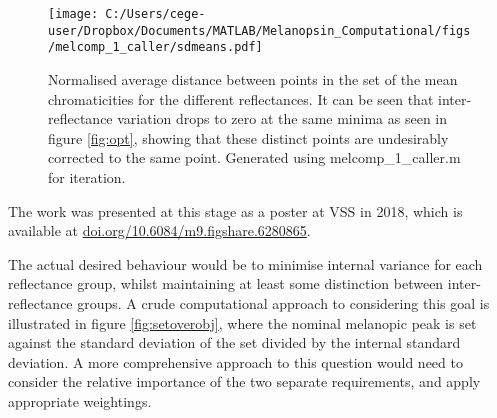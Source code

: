 \documentclass{article}
\begin{document}
\begin{figure}[ht]
    \centering
    \texttt{[image: C:/Users/cege-user/Dropbox/Documents/MATLAB/Melanopsin\_Computational/figs/melcomp\_1\_caller/sdmeans.pdf]}
    \caption{Normalised average distance between points in the set of the mean chromaticities for the different reflectances. It can be seen that inter-reflectance variation drops to zero at the same minima as seen in figure \ref{fig:opt}, showing that these distinct points are undesirably corrected to the same point. Generated using melcomp\_1\_caller.m for iteration.}
    \label{fig:sdmeans}
\end{figure} 

The work was presented at this stage as a poster at VSS in 2018, which is available at \url{doi.org/10.6084/m9.figshare.6280865}.

The actual desired behaviour would be to minimise internal variance for each reflectance group, whilst maintaining at least some distinction between inter-reflectance groups. A crude computational approach to considering this goal is illustrated in figure \ref{fig:setoverobj}, where the nominal melanopic peak is set against the standard deviation of the set divided by the internal standard deviation. A more comprehensive approach to this question would need to consider the relative importance of the two separate requirements, and apply appropriate weightings.





\end{document}
